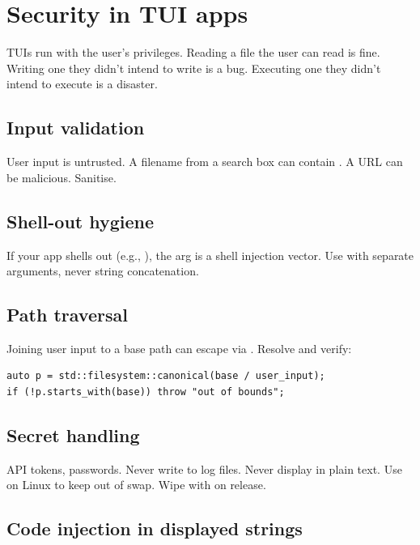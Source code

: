 \chapter{Security in TUI apps}
\label{ch:security2}

\begin{aside}
TUIs run with the user's privileges. Reading a file the user
can read is fine. Writing one they didn't intend to write is
a bug. Executing one they didn't intend to execute is a
disaster.
\end{aside}

\section{Input validation}

User input is untrusted. A filename from a search box can
contain . A URL can be malicious. Sanitise.

\section{Shell-out hygiene}

If your app shells out (e.g., ), the arg is a shell injection vector. Use
 with separate arguments, never string
concatenation.

\section{Path traversal}

Joining user input to a base path can escape via
. Resolve and verify:

\begin{lstlisting}
auto p = std::filesystem::canonical(base / user_input);
if (!p.starts_with(base)) throw "out of bounds";
\end{lstlisting}

\section{Secret handling}

API tokens, passwords. Never write to log files. Never
display in plain text. Use  on Linux to keep
out of swap. Wipe with  on release.

\section{Code injection in displayed strings}

